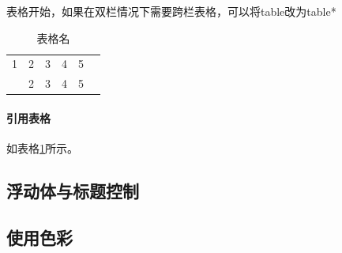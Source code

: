 \documentclass[a4paper,10 pt, conference]{article}     %
\begin{document}
    \begin{table}[h] 表格开始，如果在双栏情况下需要跨栏表格，可以将table改为table*
    \label{表格标示}
    \caption{表格名}
    \begin{center}  %
    \begin{tabular}{|c|c|c|c|c|c|}%
        \hline %
        1 &2&3 & 4 &5\\ \cline{2-5} %
        &2 &3 & 4 &5\\ \hline %
    \end{tabular}
    \end{center}
    \end{table}

   \paragraph{引用表格}
   如表格\ref{表格标示}所示。






    \subsection{浮动体与标题控制}


    \subsection{ 使用色彩}
\end{document}
